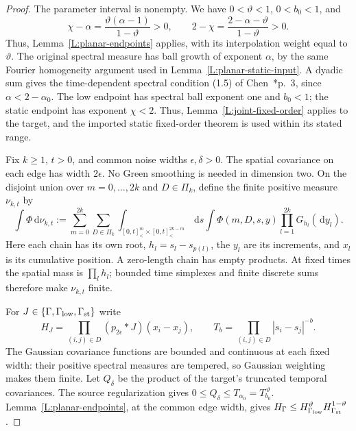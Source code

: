 \documentclass[12pt]{article}
\numberwithin{equation}{section}
\theoremstyle{definition}
\newcommand{\ud}{\,\mathrm{d}}
\begin{document}
\begin{proof}
  The parameter interval is nonempty. We have $0<\vartheta<1$,
  $0<b_0<1$, and
  \[
    \chi-\alpha=\frac{\vartheta(\alpha-1)}{1-\vartheta}>0,
    \qquad
    2-\chi=\frac{2-\alpha-\vartheta}{1-\vartheta}>0.
  \]
  Thus, Lemma~\ref{L:planar-endpoints} applies, with its interpolation
  weight equal to $\vartheta$. The original spectral measure has ball
  growth of exponent $\alpha$, by the same Fourier homogeneity argument
  used in Lemma~\ref{L:planar-static-input}. A dyadic sum gives the
  time-dependent spectral condition (1.5) of
  Chen~\cite{chen:author2026:time-dependency}*{p.~3}, since
  $\alpha<2-\alpha_0$. The low endpoint has spectral ball exponent
  one and $b_0<1$; the static endpoint has exponent $\chi<2$.
  Thus, Lemma~\ref{L:joint-fixed-order} applies to the target, and the
  imported static fixed-order theorem is used within its stated range.

  Fix $k\ge1$, $t>0$, and common noise widths $\epsilon,\delta>0$.
  The spatial covariance on each edge has width $2\epsilon$.
  No Green smoothing is needed in dimension two. On the disjoint union
  over $m=0,\ldots,2k$ and $D\in\Pi_k$, define the finite positive
  measure $\nu_{k,t}$ by
  \[
    \int\Phi\ud\nu_{k,t}
    :=\sum_{m=0}^{2k}\sum_{D\in\Pi_k}
    \int_{[0,t]^m_<\times[0,t]^{2k-m}_<}\ud s
    \int\Phi(m,D,s,y)\prod_{l=1}^{2k}G_{h_l}(\ud y_l).
  \]
  Here each chain has its own root, $h_l=s_l-s_{p(l)}$, the $y_l$
  are its increments, and $x_l$ is its cumulative position. A zero-length
  chain has empty products. At fixed times the spatial mass is
  $\prod_lh_l$; bounded time simplexes and finite discrete sums therefore
  make $\nu_{k,t}$ finite.

  For $J\in\{\Gamma,\Gamma_{\rm low},\Gamma_{\rm st}\}$ write
  \[
    H_J=\prod_{(i,j)\in D}(p_{2\epsilon}*J)(x_i-x_j),\qquad
    T_b=\prod_{(i,j)\in D}|s_i-s_j|^{-b}.
  \]
  The Gaussian covariance functions are bounded and continuous at each
  fixed width: their positive spectral measures are tempered, so Gaussian
  weighting makes them finite. Let $Q_\delta$ be the product of the
  target's truncated temporal covariances. The source regularization gives
  $0\le Q_\delta\le T_{\alpha_0}=T_{b_0}^{\,\vartheta}$.
  Lemma~\ref{L:planar-endpoints}, at the common edge width, gives
  $H_\Gamma\le H_{\Gamma_{\rm low}}^\vartheta
  H_{\Gamma_{\rm st}}^{1-\vartheta}$.


\end{proof}
\end{document}
